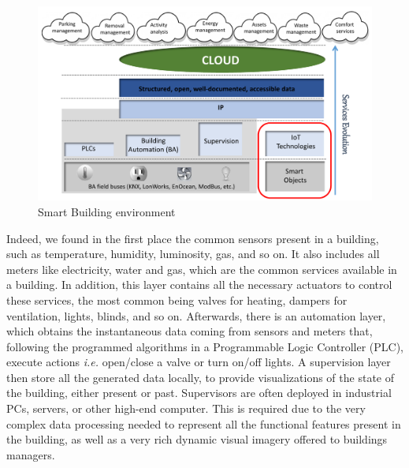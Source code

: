 \begin{figure}[htb]
	\centering
	\includegraphics[width=1\columnwidth]{chapters/background.images/SmartServices.pdf}
	\caption{Smart Building environment}
	\label{fig:SmartServices}
\end{figure}


Indeed, we found in the first place the common sensors present in a building, such as temperature, humidity, luminosity, gas, and so on. 
It also includes all meters like electricity, water and gas, which are the common services available in a building.
In addition, this layer contains all the necessary actuators to control these services, the most common being valves for heating, dampers for ventilation, lights, blinds, and so on.
Afterwards, there is an automation layer, which obtains the instantaneous data coming from sensors and meters that, following the programmed algorithms in a Programmable Logic Controller (PLC), execute actions \textit{i.e.} open/close a valve or turn on/off lights.
A supervision layer then store all the generated data locally, to provide visualizations of the state of the building, either present or past.
Supervisors are often deployed in industrial PCs, servers, or other high-end computer.
This is required due to the very complex data processing needed to represent all the functional features present in the building, as well as a very rich dynamic visual imagery offered to buildings managers.

